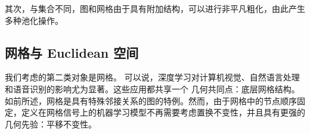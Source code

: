 其次，与集合不同，图和网格由于具有附加结构，可以进行非平凡粗化，由此产生多种池化操作。
%



\subsection{网格与 Euclidean 空间}
\label{sec:grids_euclidean}



我们考虑的第二类对象是网格。
%
可以说，深度学习对计算机视觉、自然语言处理和语音识别的影响尤为显著。这些应用都共享一个%
几何共同点：底层网格结构。
%
如前所述，网格是具有特殊邻接关系的图的特例。然而，由于网格中的节点顺序固定，定义在网格信号上的机器学习模型不再需要考虑置换不变性，并且具有更强的几何先验：平移不变性。




